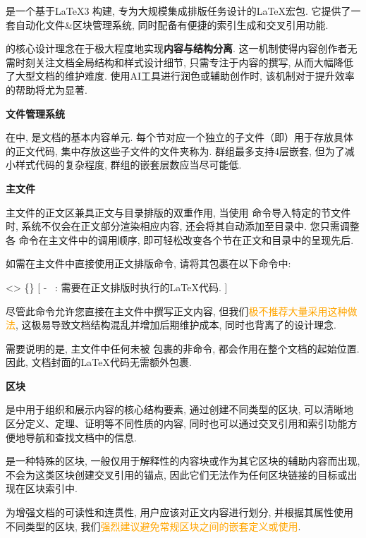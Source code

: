 
\SimpleSystemTeX 是一个基于\LaTeX3 构建, 专为大规模集成排版任务设计的\LaTeX 宏包. 它提供了一套自动化文件\&区块管理系统, 同时配备有便捷的索引生成和交叉引用功能.

\SimpleSystemTeX 的核心设计理念在于极大程度地实现\textbf{内容与结构分离}. 这一机制使得内容创作者无需时刻关注文档全局结构和样式设计细节, 只需专注于内容的撰写, 从而大幅降低了大型文档的维护难度. 使用AI工具进行润色或辅助创作时, 该机制对于提升效率的帮助将尤为显著.

\medskip\textbf{文件管理系统}

在\SimpleSystemTeX 中, 是文档的基本内容单元. 每个节对应一个独立的子文件（即）用于存放具体的正文代码, 集中存放这些子文件的文件夹称为. 群组最多支持4层嵌套, 但为了减小样式代码的复杂程度, 群组的嵌套层数应当尽可能低.

\medskip\textbf{主文件}

\SimpleSystemTeX 主文件的正文区兼具正文与目录排版的双重作用, 当使用  命令导入特定的节文件时, 系统不仅会在正文部分渲染相应内容, 还会将其自动添加至目录中. 您只需调整各  命令在主文件中的调用顺序, 即可轻松改变各个节在正文和目录中的呈现先后.

如需在主文件中直接使用正文排版命令, 请将其包裹在以下命令中:

<>{
    \{\longarg\}
}[
    - \longarg\ : 需要在正文排版时执行的\LaTeX 代码.
]

尽管此命令允许您直接在主文件中撰写正文内容, 但我们\textcolor{orange}{极不推荐大量采用这种做法}, 这极易导致文档结构混乱并增加后期维护成本, 同时也背离了\SimpleSystemTeX 的设计理念.

需要说明的是, 主文件中任何未被  包裹的非\SimpleSystemTeX 命令, 都会作用在整个文档的起始位置. 因此, 文档封面的\LaTeX 代码无需额外包裹.

\medskip\textbf{区块}

是\SimpleSystemTeX 中用于组织和展示内容的核心结构要素, 通过创建不同类型的区块, 可以清晰地区分定义、定理、证明等不同性质的内容, 同时也可以通过交叉引用和索引功能方便地导航和查找文档中的信息.

是一种特殊的区块, 一般仅用于解释性的内容块或作为其它区块的辅助内容而出现, \SimpleSystemTeX 不会为这类区块创建交叉引用的锚点, 因此它们无法作为任何区块链接的目标或出现在区块索引中.

为增强文档的可读性和连贯性, 用户应该对正文内容进行划分, 并根据其属性使用不同类型的区块, 我们\textcolor{orange}{强烈建议避免常规区块之间的嵌套定义或使用}.

